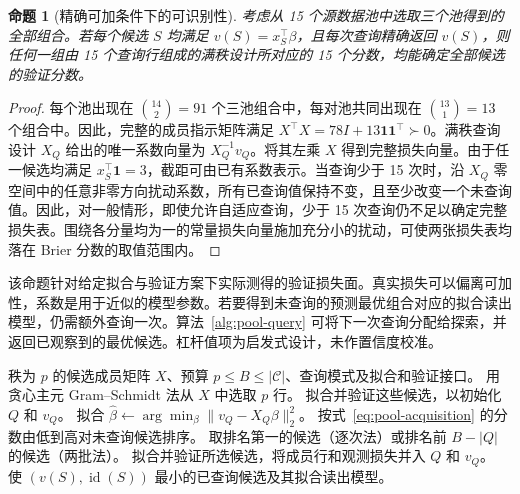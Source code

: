 \documentclass[UTF8,fontset=fandol,scheme=chinese,zihao=false,11pt,letterpaper]{ctexart}
\newcommand{\cC}{\mathcal{C}}
\newtheorem{proposition}{命题}
\begin{document}
\begin{proposition}[精确可加条件下的可识别性]
\label{prop:pool-identification}
考虑从 15 个源数据池中选取三个池得到的全部组合。若每个候选 $S$ 均满足 $v(S)=x_S^\top\beta$，且每次查询精确返回 $v(S)$，则任何一组由 15 个查询行组成的满秩设计所对应的 15 个分数，均能确定全部候选的验证分数。
\end{proposition}
\begin{proof}
每个池出现在 $\binom{14}{2}=91$ 个三池组合中，每对池共同出现在 $\binom{13}{1}=13$ 个组合中。因此，完整的成员指示矩阵满足 $X^\top X=78I+13\mathbf{1}\mathbf{1}^\top\succ0$。满秩查询设计 $X_Q$ 给出的唯一系数向量为 $X_Q^{-1}v_Q$。将其左乘 $X$ 得到完整损失向量。由于任一候选均满足 $x_S^\top\mathbf{1}=3$，截距可由已有系数表示。当查询少于 15 次时，沿 $X_Q$ 零空间中的任意非零方向扰动系数，所有已查询值保持不变，且至少改变一个未查询值。因此，对一般情形，即使允许自适应查询，少于 15 次查询仍不足以确定完整损失表。围绕各分量均为一的常量损失向量施加充分小的扰动，可使两张损失表均落在 Brier 分数的取值范围内。
\end{proof}

该命题针对给定拟合与验证方案下实际测得的验证损失面。真实损失可以偏离可加性，系数是用于近似的模型参数。若要得到未查询的预测最优组合对应的拟合读出模型，仍需额外查询一次。算法~\ref{alg:pool-query} 可将下一次查询分配给探索，并返回已观察到的最优候选。杠杆值项为启发式设计，未作置信度校准。

\begin{algorithm}[H]
\caption{利用验证反馈查询源池组合}
\label{alg:pool-query}
\begin{algorithmic}[1]
\Require 秩为 $p$ 的候选成员矩阵 $X$、预算 $p\leq B\leq|\cC|$、查询模式及拟合和验证接口。
\State 用贪心主元 Gram--Schmidt 法从 $X$ 中选取 $p$ 行。
\State 拟合并验证这些候选，以初始化 $Q$ 和 $v_Q$。
  \State 拟合 $\widehat\beta\gets\arg\min_\beta\|v_Q-X_Q\beta\|_2^2$。
  \State 按式~\eqref{eq:pool-acquisition} 的分数由低到高对未查询候选排序。
  \State 取排名第一的候选（逐次法）或排名前 $B-|Q|$ 的候选（两批法）。
  \State 拟合并验证所选候选，将成员行和观测损失并入 $Q$ 和 $v_Q$。
\EndWhile
\State \Return 使 $(v(S),\operatorname{id}(S))$ 最小的已查询候选及其拟合读出模型。
\end{algorithmic}
\end{algorithm}
\end{document}
